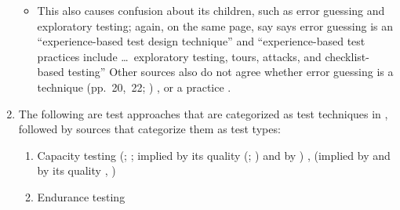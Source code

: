 \begin{enumerate}
\begin{itemize}
                        \item This also causes confusion about its children, such as
                              error guessing and exploratory testing; again, on the
                              same page,
                              \ifnotpaper
                                    \citeauthor{IEEE2022} say
                              \else
                                    \cite[p.~34]{IEEE2022} says
                              \fi error guessing is
                              an ``experience-based test design technique'' and
                              ``experience-based test practices include \dots\
                              exploratory testing, tours, attacks, and
                              checklist-based testing''%
                              \else{.}
                              \fi
                              Other sources also do not agree whether error guessing
                              is a technique
                              \ifnotpaper
                                    (pp.~20,~22; \citeyear[p.~viii]{IEEE2021})
                              \else
                                    \cite[pp.~20,~22]{IEEE2022}, \cite[p.~viii]{IEEE2021}
                              \fi
                              or a practice \citep[p.~5-14]{SWEBOK2024}.
                  \end{itemize}
            \fi
      \item The following are test approaches that are categorized as test
            techniques in \citep[p.~38]{IEEE2021}, followed by sources that
            categorize them as test types:
            \begin{enumerate}
                  \item Capacity testing
                        \ifnotpaper
                              (\citealp[p.~22]{IEEE2022};
                              \citeyear[p.~2]{IEEE2013}; implied by its quality
                              (\citealp{ISO_IEC2023a}; \citealp[Tab.~A.1]{IEEE2021})
                              and by \citep[p.~53]{Firesmith2015})
                        \else
                              \cite[p.~22]{IEEE2022}, \cite[p.~2]{IEEE2013} (implied by
                              \cite[p.~53]{Firesmith2015} and by its quality
                              \cite{ISO_IEC2023a}, \cite[Tab.~A.1]{IEEE2021})
                        \fi
                  \item Endurance testing

\end{enumerate}
\end{enumerate}
